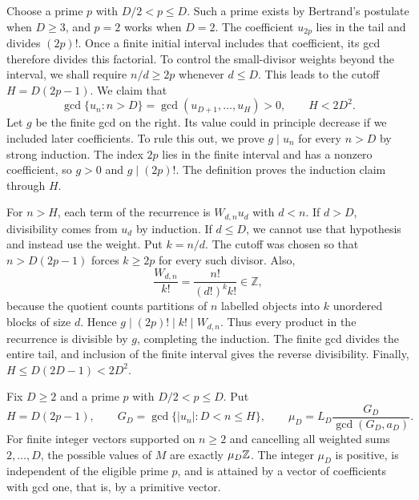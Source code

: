 \documentclass[11pt]{article}
\begin{document}
Choose a prime $p$ with $D/2<p\le D$. Such a prime exists by Bertrand's
postulate when $D\ge3$, and $p=2$ works when $D=2$. The coefficient
$u_{2p}$ lies in the tail and divides $(2p)!$. Once a finite initial
interval includes that coefficient, its gcd therefore divides this
factorial. To control the small-divisor weights beyond the interval,
we shall require $n/d\ge2p$ whenever $d\le D$. This leads to the
cutoff $H=D(2p-1)$. We claim that
\begin{equation}\label{long68:eq:finite-horizon}
 \gcd\{u_n:n>D\}=\gcd(u_{D+1},\ldots,u_H)>0,\qquad H<2D^2.
\end{equation}
Let $g$ be the finite gcd on the right. Its value could in principle
decrease if we included later coefficients. To rule this out, we prove
$g\mid u_n$ for every $n>D$ by strong induction.
The index $2p$ lies in the finite interval and has a nonzero coefficient,
so $g>0$ and $g\mid(2p)!$. The definition proves the induction claim
through $H$.

For $n>H$, each term of the recurrence is $W_{d,n}u_d$ with $d<n$.
If $d>D$, divisibility comes from $u_d$ by induction. If $d\le D$,
we cannot use that hypothesis and instead use the weight. Put $k=n/d$.
The cutoff was chosen so that $n>D(2p-1)$ forces $k\ge2p$ for
every such divisor. Also,
\[
 \frac{W_{d,n}}{k!}=\frac{n!}{(d!)^k k!}\in\mathbb Z,
\]
because the quotient counts partitions of $n$ labelled objects into
$k$ unordered blocks of size $d$. Hence
$g\mid(2p)!\mid k!\mid W_{d,n}$. Thus every product in the recurrence
is divisible by $g$, completing the induction.
The finite gcd divides the entire tail, and inclusion of the finite
interval gives the reverse divisibility. Finally,
$H\le D(2D-1)<2D^2$.

\begin{theorem}\label{long68:res:moment-ideal}
Fix $D\ge2$ and a prime $p$ with $D/2<p\le D$.  Put
\[
 H=D(2p-1),\qquad
 G_D=\gcd\{|u_n|:D<n\le H\},\qquad
 \mu_D=L_D\frac{G_D}{\gcd(G_D,a_D)}.
\]
For finite integer vectors supported on $n\ge2$ and cancelling all
weighted sums $2,\ldots,D$, the possible values of $M$ are exactly $\mu_D\mathbb{Z}$.  The integer $\mu_D$ is positive,
is independent of the eligible prime $p$, and is attained by a vector of
coefficients with gcd one, that is, by a primitive vector.
\end{theorem}
\end{document}
